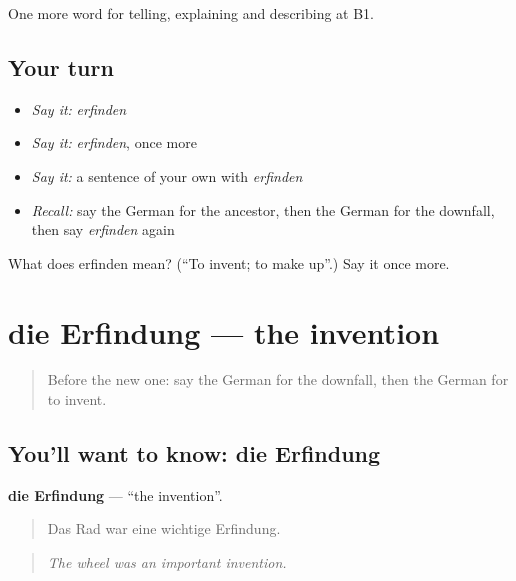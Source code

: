 \begin{grammarlens}[title={What you've built}]
One more word for telling, explaining and describing at B1.
\end{grammarlens}

\subsection*{Your turn}
\begin{itemize}
\raggedright
  \item \emph{Say it:} \emph{erfinden}
  \item \emph{Say it:} \emph{erfinden}, once more
  \item \emph{Say it:} a sentence of your own with \emph{erfinden}
  \item \emph{Recall:} say the German for the ancestor, then the German for the downfall, then say \emph{erfinden} again
\end{itemize}

\begin{tcolorbox}[breakable,colback=teal!4,colframe=teal!35!black,title={Before you move on}]
What does erfinden mean? (\textquotedblleft{}To invent; to make up\textquotedblright{}.) Say it once more.
\end{tcolorbox}
\section[die Erfindung]{die Erfindung — the invention}

\label{lesson:GE-C321-erfindung}



\begin{quote}
Before the new one: say the German for the downfall, then the German for to invent.
\end{quote}

\subsection*{You'll want to know: die Erfindung}
\textbf{die Erfindung} — \textquotedblleft{}the invention\textquotedblright{}.

\begin{quote}
Das Rad war eine wichtige Erfindung.
\end{quote}

\begin{quote}
\emph{The wheel was an important invention.}
\end{quote}

